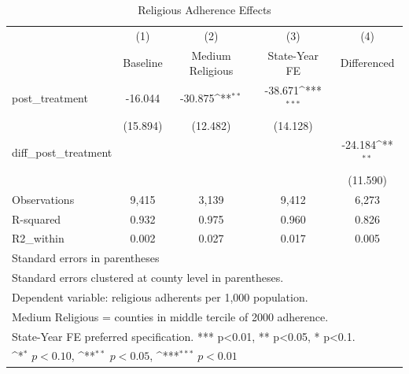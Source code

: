 \begin{table}[htbp]\centering
\def\sym#1{\ifmmode^{#1}\else\(^{#1}\)\fi}
\caption{Religious Adherence Effects}
\begin{tabular}{l*{4}{c}}
\hline\hline
            &\multicolumn{1}{c}{(1)}&\multicolumn{1}{c}{(2)}&\multicolumn{1}{c}{(3)}&\multicolumn{1}{c}{(4)}\\
            &\multicolumn{1}{c}{Baseline}&\multicolumn{1}{c}{Medium Religious}&\multicolumn{1}{c}{State-Year FE}&\multicolumn{1}{c}{Differenced}\\
\hline
post\_treatment&     -16.044         &     -30.875\sym{**} &     -38.671\sym{***}&                     \\
            &    (15.894)         &    (12.482)         &    (14.128)         &                     \\
[1em]
diff\_post\_treatment&                     &                     &                     &     -24.184\sym{**} \\
            &                     &                     &                     &    (11.590)         \\
\hline
Observations&       9,415         &       3,139         &       9,412         &       6,273         \\
R-squared   &       0.932         &       0.975         &       0.960         &       0.826         \\
R2\_within   &       0.002         &       0.027         &       0.017         &       0.005         \\
\hline\hline
\multicolumn{5}{l}{\footnotesize Standard errors in parentheses}\\
\multicolumn{5}{l}{\footnotesize Standard errors clustered at county level in parentheses.}\\
\multicolumn{5}{l}{\footnotesize Dependent variable: religious adherents per 1,000 population.}\\
\multicolumn{5}{l}{\footnotesize Medium Religious = counties in middle tercile of 2000 adherence.}\\
\multicolumn{5}{l}{\footnotesize State-Year FE preferred specification. *** p<0.01, ** p<0.05, * p<0.1.}\\
\multicolumn{5}{l}{\footnotesize \sym{*} \(p<0.10\), \sym{**} \(p<0.05\), \sym{***} \(p<0.01\)}\\
\end{tabular}
\end{table}
